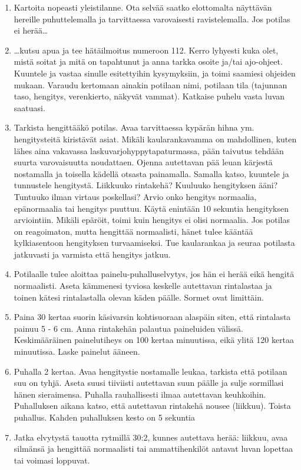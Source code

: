 \begin{enumerate}[label=\bfseries \arabic*)]
\item  Kartoita nopeasti yleistilanne. Ota selvää saatko elottomalta näyttävän hereille puhuttelemalla ja tarvittaessa varovaisesti ravistelemalla. Jos potilas ei herää… 
\item  …kutsu apua ja tee hätäilmoitus numeroon 112. Kerro lyhyesti kuka olet, mistä soitat ja mitä on tapahtunut ja anna tarkka osoite ja/tai ajo-ohjeet. Kuuntele ja vastaa sinulle esitettyihin kysymyksiin, ja toimi saamiesi ohjeiden mukaan. Varaudu kertomaan ainakin potilaan nimi, potilaan tila (tajunnan taso, hengitys, verenkierto, näkyvät vammat). Katkaise puhelu vasta luvan saatuasi. 
\item  Tarkista hengittääkö potilas. Avaa tarvittaessa kypärän hihna ym. hengitysteitä kiristävät asiat. Mikäli kaularankavamma on mahdollinen, kuten lähes aina vakavassa laskuvarjohyppytapaturmassa, pään taivutus tehdään suurta varovaisuutta noudattaen. Ojenna autettavan pää leuan kärjestä nostamalla ja toisella kädellä otsasta painamalla. Samalla katso, kuuntele ja tunnustele hengitystä. Liikkuuko rintakehä? Kuuluuko hengityksen ääni? Tuntuuko ilman virtaus poskellasi? Arvio onko hengitys normaalia, epänormaalia tai hengitys puuttuu. Käytä enintään 10 sekuntia hengityksen arviointiin. Mikäli epäröit, toimi kuin hengitys ei olisi normaalia. Jos potilas on reagoimaton, mutta hengittää normaalisti, hänet tulee kääntää kylkiasentoon hengityksen turvaamiseksi. Tue kaularankaa ja seuraa potilasta jatkuvasti ja varmista että hengitys jatkuu. 
\item  Potilaalle tulee aloittaa painelu-puhalluselvytys, jos hän ei herää eikä hengitä normaalisti. Aseta kämmenesi tyviosa keskelle autettavan rintalastaa ja toinen kätesi rintalastalla olevan käden päälle. Sormet ovat limittäin.  
\item  Paina 30 kertaa suorin käsivarsin kohtisuoraan alaspäin siten, että rintalasta painuu 5 - 6 cm. Anna rintakehän palautua paineluiden välissä. Keskimääräinen painelutiheys on 100 kertaa minuutissa, eikä ylitä 120 kertaa minuutissa. Laske painelut ääneen. 
\item  Puhalla 2 kertaa. Avaa hengitystie nostamalle leukaa, tarkista että potilaan suu on tyhjä. Aseta suusi tiiviisti autettavan suun päälle ja sulje sormillasi hänen sieraimensa. Puhalla rauhallisesti ilmaa autettavan keuhkoihin. Puhalluksen aikana katso, että autettavan rintakehä nousee (liikkuu). Toista puhallus. Kahden puhalluksen kesto on 5 sekuntia 
\item  Jatka elvytystä tauotta rytmillä 30:2, kunnes autettava herää: liikkuu, avaa silmänsä ja hengittää normaalisti tai ammattihenkilöt antavat luvan lopettaa tai voimasi loppuvat. 
\end{enumerate}
